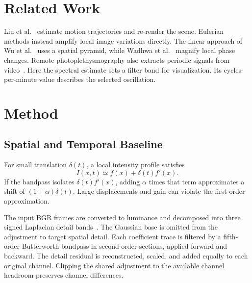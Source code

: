 \documentclass[10pt,twocolumn,letterpaper]{article}
\begin{document}
\section{Related Work}
Liu et al.~\cite{liu2005motion} estimate motion trajectories and re-render the
scene. Eulerian methods instead amplify local image variations directly.
The linear approach of Wu et al.~\cite{wu2012eulerian} uses a spatial pyramid,
while Wadhwa et al.~\cite{wadhwa2013phase} magnify local phase changes.
Remote photoplethysmography also extracts periodic signals from
video~\cite{verkruysse2008remote,poh2010noncontact}. Here the spectral estimate
sets a filter band for visualization. Its cycles-per-minute value describes
the selected oscillation.

\section{Method}
\subsection{Spatial and Temporal Baseline}
For small translation $\delta(t)$, a local intensity profile satisfies
\begin{equation}
  I(x,t) \simeq f(x) + \delta(t) f'(x).
\end{equation}
If the bandpass isolates $\delta(t)f'(x)$, adding $\alpha$ times that term
approximates a shift of $(1+\alpha)\delta(t)$. Large displacements and gain
can violate the first-order approximation.

The input BGR frames are converted to luminance and decomposed into three
signed Laplacian detail bands~\cite{burt1983laplacian}. The Gaussian base is
omitted from the adjustment to target spatial detail. Each coefficient
trace is filtered by a fifth-order Butterworth bandpass in second-order
sections, applied forward and backward. The detail residual is reconstructed,
scaled, and added equally to each original channel. Clipping the shared
adjustment to the available channel headroom preserves channel differences.
\end{document}

